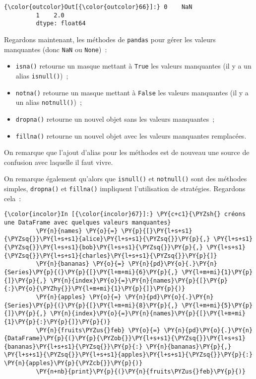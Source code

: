 \begin{Verbatim}[commandchars=\\\{\}]
{\color{outcolor}Out[{\color{outcolor}66}]:} 0    NaN
         1    2.0
         dtype: float64
\end{Verbatim}
            
    Regardons maintenant, les méthodes de \texttt{pandas} pour gérer les
valeurs manquantes (donc \texttt{NaN} ou \texttt{None})~:

\begin{itemize}
\tightlist
\item
  \texttt{isna()} retourne un masque mettant à \texttt{True} les valeurs
  manquantes (il y a un alias \texttt{isnull()})~;
\item
  \texttt{notna()} retourne un masque mettant à \texttt{False} les
  valeurs manquantes (il y a un alias \texttt{notnull()})~;
\item
  \texttt{dropna()} retourne un nouvel objet sans les valeurs
  manquantes~;
\item
  \texttt{fillna()} retourne un nouvel objet avec les valeurs manquantes
  remplacées.
\end{itemize}

On remarque que l'ajout d'alias pour les méthodes est de nouveau une
source de confusion avec laquelle il faut vivre.

On remarque également qu'alors que \texttt{isnull()} et
\texttt{notnull()} sont des méthodes simples, \texttt{dropna()} et
\texttt{fillna()} impliquent l'utilisation de stratégies. Regardons
cela~:

    \begin{Verbatim}[commandchars=\\\{\}]
{\color{incolor}In [{\color{incolor}67}]:} \PY{c+c1}{\PYZsh{} créons une DataFrame avec quelques valeurs manquantes}
         \PY{n}{names} \PY{o}{=} \PY{p}{[}\PY{l+s+s1}{\PYZsq{}}\PY{l+s+s1}{alice}\PY{l+s+s1}{\PYZsq{}}\PY{p}{,} \PY{l+s+s1}{\PYZsq{}}\PY{l+s+s1}{bob}\PY{l+s+s1}{\PYZsq{}}\PY{p}{,} \PY{l+s+s1}{\PYZsq{}}\PY{l+s+s1}{charles}\PY{l+s+s1}{\PYZsq{}}\PY{p}{]}
         \PY{n}{bananas} \PY{o}{=} \PY{n}{pd}\PY{o}{.}\PY{n}{Series}\PY{p}{(}\PY{p}{[}\PY{l+m+mi}{6}\PY{p}{,} \PY{l+m+mi}{1}\PY{p}{]}\PY{p}{,} \PY{n}{index}\PY{o}{=}\PY{n}{names}\PY{p}{[}\PY{p}{:}\PY{o}{\PYZhy{}}\PY{l+m+mi}{1}\PY{p}{]}\PY{p}{)}
         \PY{n}{apples} \PY{o}{=} \PY{n}{pd}\PY{o}{.}\PY{n}{Series}\PY{p}{(}\PY{p}{[}\PY{l+m+mi}{8}\PY{p}{,} \PY{l+m+mi}{5}\PY{p}{]}\PY{p}{,} \PY{n}{index}\PY{o}{=}\PY{n}{names}\PY{p}{[}\PY{l+m+mi}{1}\PY{p}{:}\PY{p}{]}\PY{p}{)}
         \PY{n}{fruits\PYZus{}feb} \PY{o}{=} \PY{n}{pd}\PY{o}{.}\PY{n}{DataFrame}\PY{p}{(}\PY{p}{\PYZob{}}\PY{l+s+s1}{\PYZsq{}}\PY{l+s+s1}{bananas}\PY{l+s+s1}{\PYZsq{}}\PY{p}{:} \PY{n}{bananas}\PY{p}{,} \PY{l+s+s1}{\PYZsq{}}\PY{l+s+s1}{apples}\PY{l+s+s1}{\PYZsq{}}\PY{p}{:} \PY{n}{apples}\PY{p}{\PYZcb{}}\PY{p}{)}
         \PY{n+nb}{print}\PY{p}{(}\PY{n}{fruits\PYZus{}feb}\PY{p}{)}
\end{Verbatim}


